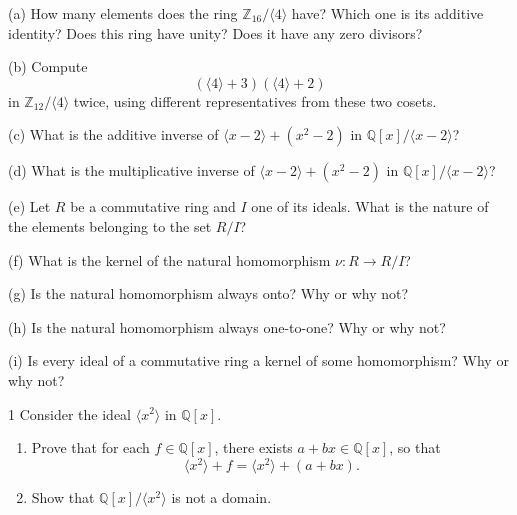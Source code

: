 \begin{problem}[Warmup]{(a)}
    How many elements does the ring $\mathbb{Z}_{16}/\langle 4 \rangle$ have? Which one is its additive identity? Does this ring have unity? Does it have any zero divisors?
\end{problem}
\unsolved

\begin{problem}[Warmup]{(b)}
    Compute \[(\langle 4 \rangle + 3)(\langle 4 \rangle + 2)\] in $\mathbb{Z}_{12}/\langle 4 \rangle$ twice, using different representatives from these two cosets.
\end{problem}
\unsolved

\begin{problem}[Warmup]{(c)}
    What is the additive inverse of $\langle x - 2 \rangle + (x^2 - 2)$ in $\mathbb{Q}[x]/\langle x - 2 \rangle$?
\end{problem}
\unsolved

\begin{problem}[Warmup]{(d)}
    What is the multiplicative inverse of $\langle x - 2 \rangle + (x^2 - 2)$ in $\mathbb{Q}[x]/\langle x - 2 \rangle$?
\end{problem}
\unsolved

\begin{problem}[Warmup]{(e)}
    Let $R$ be a commutative ring and $I$ one of its ideals. What is the nature of the elements belonging to the set $R/I$?
\end{problem}
\unsolved

\begin{problem}[Warmup]{(f)}
    What is the kernel of the natural homomorphism $\nu : R \to R/I$?
\end{problem}
\unsolved

\begin{problem}[Warmup]{(g)}
    Is the natural homomorphism always onto? Why or why not?
\end{problem}
\unsolved

\begin{problem}[Warmup]{(h)}
    Is the natural homomorphism always one-to-one? Why or why not?
\end{problem}
\unsolved

\begin{problem}[Warmup]{(i)}
    Is every ideal of a commutative ring a kernel of some homomorphism? Why or why not?
\end{problem}
\unsolved

\begin{problem}{1}
    Consider the ideal $\langle x^2 \rangle$ in $\mathbb{Q}[x]$.
    \begin{enumerate}
        \item[(a)] Prove that for each $f \in \mathbb{Q}[x]$, there exists
        $a + bx \in \mathbb{Q}[x]$, so that
        \[\langle x^2 \rangle + f = \langle x^2 \rangle + (a + bx).\]
        \item[(b)] Show that $\mathbb{Q}[x]/\langle x^2 \rangle$ is not a domain.
    \end{enumerate}
\end{problem}
\unsolved

